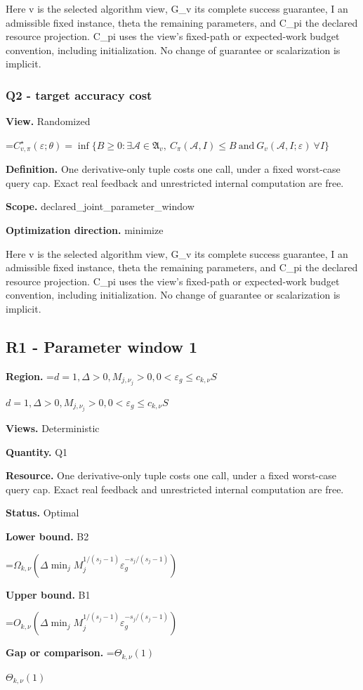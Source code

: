 \documentclass[10pt,a4paper]{article}
\newcommand{\AtlasMath}[1]{\par\begingroup\centering\setbox0=\hbox{$\displaystyle #1$}\ifdim\wd0>1.4\linewidth\typeout{ATLAS WIDE FORMULA: \the\wd0}\fi\ifdim\wd0>\linewidth\resizebox{\linewidth}{!}{\box0}\else\box0\fi\par\endgroup}
\newcommand{\AtlasInlineMath}[1]{\begingroup\setbox0=\hbox{$#1$}\ifdim\wd0>.4\linewidth\endgroup\AtlasMath{#1}\else\endgroup$#1$\fi}
\begin{document}
Here v is the selected algorithm view, G\_v its complete success guarantee, I an admissible fixed instance, theta the remaining parameters, and C\_pi the declared resource projection. C\_pi uses the view's fixed-path or expected-work budget convention, including initialization. No change of guarantee or scalarization is implicit.

\subsubsection{Q2 - target accuracy cost}
\textbf{View.} Randomized

\AtlasMath{C^\star_{v,\pi}(\varepsilon;\theta)=\inf\{B\ge0:\exists\mathcal A\in\mathfrak A_v,\ C_\pi(\mathcal A,I)\le B\ \text{and}\ G_v(\mathcal A,I;\varepsilon)\ \forall I\}}
\textbf{Definition.} One derivative-only tuple costs one call, under a fixed worst-case query cap. Exact real feedback and unrestricted internal computation are free.

\textbf{Scope.} declared\_joint\_parameter\_window

\textbf{Optimization direction.} minimize

Here v is the selected algorithm view, G\_v its complete success guarantee, I an admissible fixed instance, theta the remaining parameters, and C\_pi the declared resource projection. C\_pi uses the view's fixed-path or expected-work budget convention, including initialization. No change of guarantee or scalarization is implicit.

\subsection{R1 - Parameter window 1}
\textbf{Region.} \AtlasInlineMath{d=1,\Delta>0,M_{j,\nu_j}>0,0<\varepsilon_g\le c_{k,\nu}S}

\textbf{Views.} Deterministic

\textbf{Quantity.} Q1

\textbf{Resource.} One derivative-only tuple costs one call, under a fixed worst-case query cap. Exact real feedback and unrestricted internal computation are free.

\textbf{Status.} Optimal

\textbf{Lower bound.} B2

\AtlasMath{\Omega_{k,\nu}(\Delta \min_j M_j^{1/(s_j-1)}\varepsilon_g^{-s_j/(s_j-1)})}
\textbf{Upper bound.} B1

\AtlasMath{O_{k,\nu}(\Delta \min_j M_j^{1/(s_j-1)}\varepsilon_g^{-s_j/(s_j-1)})}
\textbf{Gap or comparison.} \AtlasInlineMath{\Theta_{k,\nu}(1)}
\end{document}
